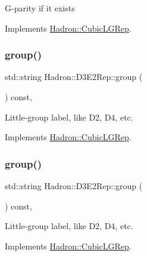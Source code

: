 G-\/parity if it exists 

Implements \mbox{\hyperlink{structHadron_1_1CubicLGRep_ace26f7b2d55e3a668a14cb9026da5231}{Hadron\+::\+Cubic\+L\+G\+Rep}}.

\mbox{\label{structHadron_1_1D3E2Rep_a81f6acc24c457b0fcdbbc468848dbfa1}} 
\subsubsection{\texorpdfstring{group()}{group()}\hspace{0.1cm}{\footnotesize\ttfamily [1/3]}}
{\footnotesize\ttfamily std\+::string Hadron\+::\+D3\+E2\+Rep\+::group (\begin{DoxyParamCaption}{ }\end{DoxyParamCaption}) const\hspace{0.3cm}{\ttfamily [inline]}, {\ttfamily [virtual]}}

Little-\/group label, like D2, D4, etc. 

Implements \mbox{\hyperlink{structHadron_1_1CubicLGRep_a9bdb14b519a611d21379ed96a3a9eb41}{Hadron\+::\+Cubic\+L\+G\+Rep}}.

\mbox{\label{structHadron_1_1D3E2Rep_a81f6acc24c457b0fcdbbc468848dbfa1}} 
\subsubsection{\texorpdfstring{group()}{group()}\hspace{0.1cm}{\footnotesize\ttfamily [2/3]}}
{\footnotesize\ttfamily std\+::string Hadron\+::\+D3\+E2\+Rep\+::group (\begin{DoxyParamCaption}{ }\end{DoxyParamCaption}) const\hspace{0.3cm}{\ttfamily [inline]}, {\ttfamily [virtual]}}

Little-\/group label, like D2, D4, etc. 

Implements \mbox{\hyperlink{structHadron_1_1CubicLGRep_a9bdb14b519a611d21379ed96a3a9eb41}{Hadron\+::\+Cubic\+L\+G\+Rep}}.

\mbox{\label{structHadron_1_1D3E2Rep_a81f6acc24c457b0fcdbbc468848dbfa1}} 
